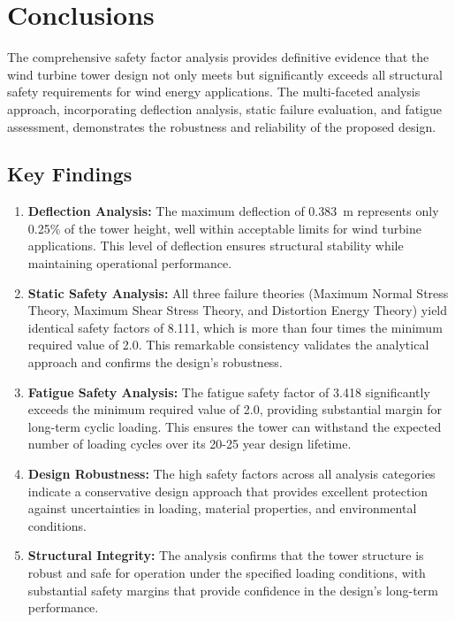 \documentclass[12pt]{article}
\begin{document}
\section{Conclusions}

The comprehensive safety factor analysis provides definitive evidence that the wind turbine tower design not only meets but significantly exceeds all structural safety requirements for wind energy applications. The multi-faceted analysis approach, incorporating deflection analysis, static failure evaluation, and fatigue assessment, demonstrates the robustness and reliability of the proposed design.

\subsection{Key Findings}

\begin{enumerate}
    \item \textbf{Deflection Analysis:} The maximum deflection of \SI{0.383}{\meter} represents only 0.25\% of the tower height, well within acceptable limits for wind turbine applications. This level of deflection ensures structural stability while maintaining operational performance.
    
    \item \textbf{Static Safety Analysis:} All three failure theories (Maximum Normal Stress Theory, Maximum Shear Stress Theory, and Distortion Energy Theory) yield identical safety factors of 8.111, which is more than four times the minimum required value of 2.0. This remarkable consistency validates the analytical approach and confirms the design's robustness.
    
    \item \textbf{Fatigue Safety Analysis:} The fatigue safety factor of 3.418 significantly exceeds the minimum required value of 2.0, providing substantial margin for long-term cyclic loading. This ensures the tower can withstand the expected number of loading cycles over its 20-25 year design lifetime.
    
    \item \textbf{Design Robustness:} The high safety factors across all analysis categories indicate a conservative design approach that provides excellent protection against uncertainties in loading, material properties, and environmental conditions.
    
    \item \textbf{Structural Integrity:} The analysis confirms that the tower structure is robust and safe for operation under the specified loading conditions, with substantial safety margins that provide confidence in the design's long-term performance.
\end{enumerate}
\end{document}
